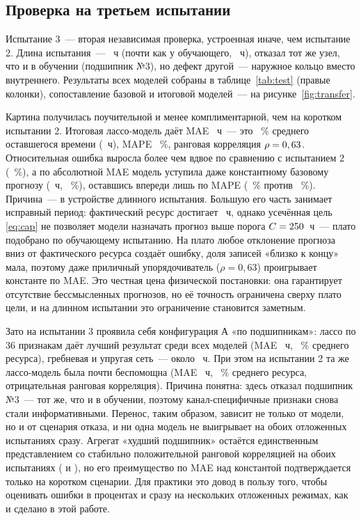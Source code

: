 \documentclass[14pt,a4paper]{extarticle}
\begin{document}
\subsection{Проверка на третьем испытании}

Испытание 3~--- вторая независимая проверка, устроенная иначе, чем
испытание 2. Длина испытания~--- \DurHoldoutThree~ч (почти как у
обучающего, \DurTrain~ч), отказал тот же узел, что и в обучении
(подшипник №3), но дефект другой~--- наружное кольцо вместо внутреннего.
Результаты всех моделей собраны в таблице~\ref{tab:test} (правые колонки),
сопоставление базовой и итоговой моделей~--- на рисунке~\ref{fig:transfer}.

Картина получилась поучительной и менее комплиментарной, чем на коротком
испытании 2. Итоговая лассо-модель даёт MAE \BestMAETestThree~ч~--- это
\BestNMAETestThree~\% среднего оставшегося времени (\MeanRulTestThree~ч),
MAPE \BestMAPETestThree~\%, ранговая корреляция $\rho=0,63$.
Относительная ошибка выросла более чем вдвое по сравнению с испытанием 2
(\BestNMAETest~\%), а по абсолютной MAE модель уступила даже константному
базовому прогнозу (\BaseMAETestThree~ч, \BaseNMAETestThree~\%), оставшись
впереди лишь по MAPE (\BestMAPETestThree~\% против \BaseMAPETestThree~\%).
Причина~--- в устройстве длинного испытания. Большую его часть занимает
исправный период: фактический ресурс достигает \RulMaxHoldoutThree~ч,
однако усечённая цель \eqref{eq:cap} не позволяет модели назначать прогноз
выше порога $C=250$~ч~--- плато подобрано по обучающему
испытанию. На плато любое отклонение прогноза вниз от фактического
ресурса создаёт ошибку, доля записей «близко к концу» мала, поэтому даже
приличный упорядочиватель ($\rho=0{,}63$) проигрывает константе по MAE.
Это честная цена физической постановки: она гарантирует отсутствие
бессмысленных прогнозов, но её точность ограничена сверху плато цели,
и на длинном испытании это ограничение становится заметным.

Зато на испытании 3 проявила себя конфигурация А «по подшипникам»:
лассо по 36 признакам даёт лучший результат среди всех моделей
(MAE \LassoAMAETestThree~ч, \LassoANMAETestThree~\% среднего ресурса),
гребневая и упругая сеть~--- около \RidgeAMAETestThree~ч. При этом на
испытании 2 та же лассо-модель была почти беспомощна (MAE \LassoAMAETest~ч,
\LassoANMAETest~\% среднего ресурса, отрицательная ранговая корреляция).
Причина понятна: здесь отказал подшипник №3~--- тот же, что и в обучении,
поэтому канал-специфичные признаки снова стали информативными. Перенос,
таким образом, зависит не только от модели, но и от сценария отказа,
и ни одна модель не выигрывает на обоих отложенных испытаниях сразу.
Агрегат «худший подшипник» остаётся единственным представлением со
стабильно положительной ранговой корреляцией на обоих испытаниях
(\BestRhoTest{} и \BestRhoTestThree), но его преимущество по MAE над
константой подтверждается только на коротком сценарии. Для практики
это довод в пользу того, чтобы оценивать ошибки в процентах и сразу
на нескольких отложенных режимах, как и сделано в этой работе.
\end{document}
